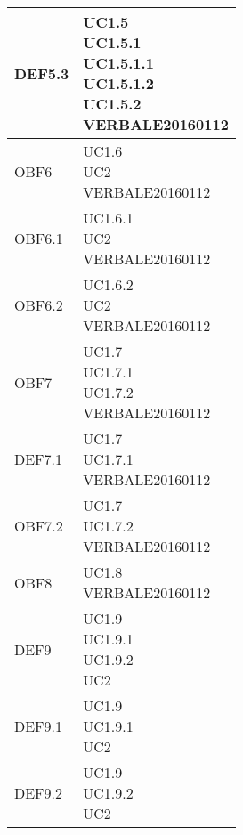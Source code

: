 \documentclass{scalatekids-article}
\begin{document}
\begin{longtable}[H]{|p{5.5cm}|p{5.5cm}|}
  \hline
  DEF5.3 & \multiLineCell[t]{UC1.5\\UC1.5.1\\UC1.5.1.1\\UC1.5.1.2\\UC1.5.2\\VERBALE20160112\\}\\
  \hline
  OBF6 & \multiLineCell[t]{UC1.6\\UC2\\VERBALE20160112\\}\\
  \hline
  OBF6.1 & \multiLineCell[t]{UC1.6.1\\UC2\\VERBALE20160112\\}\\
  \hline
  OBF6.2 & \multiLineCell[t]{UC1.6.2\\UC2\\VERBALE20160112\\}\\
  \hline
  OBF7 & \multiLineCell[t]{UC1.7\\UC1.7.1\\UC1.7.2\\VERBALE20160112\\}\\
  \hline
  DEF7.1 & \multiLineCell[t]{UC1.7\\UC1.7.1\\VERBALE20160112\\}\\
  \hline
  OBF7.2 & \multiLineCell[t]{UC1.7\\UC1.7.2\\VERBALE20160112\\}\\
  \hline
  OBF8 & \multiLineCell[t]{UC1.8\\VERBALE20160112\\}\\
  \hline
  DEF9 & \multiLineCell[t]{UC1.9\\UC1.9.1\\UC1.9.2\\UC2\\}\\
  \hline
  DEF9.1 & \multiLineCell[t]{UC1.9\\UC1.9.1\\UC2\\}\\
  \hline
  DEF9.2 & \multiLineCell[t]{UC1.9\\UC1.9.2\\UC2\\}\\

\end{longtable}
\end{document}
